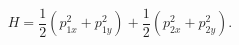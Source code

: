 \begin{equation}
   H=\frac{1}{2}(p_{1x}^2+p_{1y}^2)+\frac{1}{2}(p_{2x}^2+p_{2y}^2).
   \end{equation}

